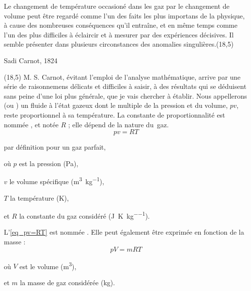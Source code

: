 			Le changement de température occasioné dans les gaz par le changement de volume peut être regardé comme l’un des faits les plus importans de la physique, à cause des nombreuses conséquences qu’il entraîne, et en même temps comme l’un des plus difficiles à éclaircir et à mesurer par des expériences décisives. Il semble présenter dans plusieurs circonstances des anomalies singulières.\nolinebreak\makebox(18,5){\color{gray}}\par\vspace{-0.3cm}\begin{flushright}Sadi Carnot, 1824~\cite{carnot1824}\end{flushright}
		\makebox(18,5){\color{gray}}
		M. S. Carnot, évitant l’emploi de l’analyse mathématique, arrive par une série de raisonnemens délicats et difficiles à saisir, à des résultats qui se déduisent sans peine d’une loi plus générale, que je vais chercher à établir.
		Nous appellerons  (ou ) un fluide à l’état gazeux dont le multiple de la pression et du volume, $p v$, reste proportionnel à sa température. La constante de proportionnalité est nommée , et notée $R$ ; elle dépend de la nature du~gaz.
		\begin{equation}
			p v = R T
			\label{eq_pv=RT}
		\end{equation}
		\begin{equationterms}
			\item par définition pour un gaz parfait,
			\item où \tab $p$ \tab est la pression (\si{\pascal}),
			\item 	\tab $v$ \tab le volume spécifique (\si{\metre\cubed\per\kilogram}),
			\item 	\tab $T$ \tab la température (\si{\kelvin}),
			\item et \tab $R$ \tab la constante du gaz considéré (\si{\joule\per\kelvin\per\kilogram}).
		\end{equationterms}

		L’\cref{eq_pv=RT} est nommée . Elle peut également être exprimée en fonction de la masse :
		\begin{equation}
			p V = m R T
			\label{eq_pV=mRT}
		\end{equation}
		\begin{equationterms}
			\item où \tab $V$ \tab est le volume (\si{\metre\cubed}),
			\item et \tab $m$ \tab la masse de gaz considérée (\si{\kilogram}).
		\end{equationterms}
		
